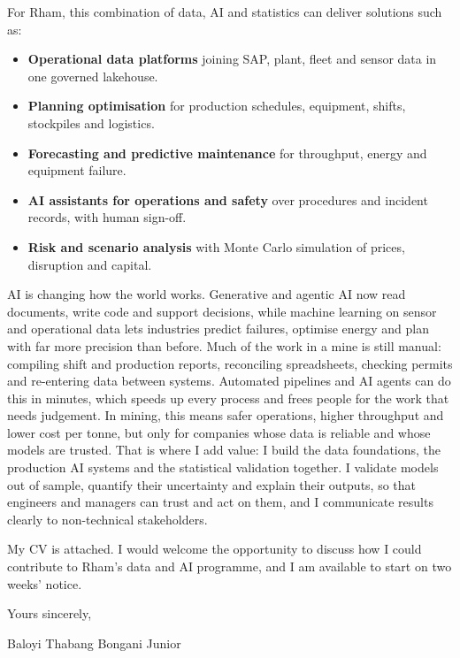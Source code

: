\documentclass[a4paper,11pt]{article}
\begin{document}
For Rham, this combination of data, AI and statistics can deliver solutions such as:
\begin{itemize}[leftmargin=0.2in,itemsep=1pt,topsep=0pt]
    \item \textbf{Operational data platforms} joining SAP, plant, fleet and sensor data in one governed lakehouse.
    \item \textbf{Planning optimisation} for production schedules, equipment, shifts, stockpiles and logistics.
    \item \textbf{Forecasting and predictive maintenance} for throughput, energy and equipment failure.
    \item \textbf{AI assistants for operations and safety} over procedures and incident records, with human sign-off.
    \item \textbf{Risk and scenario analysis} with Monte Carlo simulation of prices, disruption and capital.
\end{itemize}

AI is changing how the world works. Generative and agentic AI now read documents, write code and
support decisions, while machine learning on sensor and operational data lets industries predict
failures, optimise energy and plan with far more precision than before. Much of the work in a mine is
still manual: compiling shift and production reports, reconciling spreadsheets, checking permits and
re-entering data between systems. Automated pipelines and AI agents can do this in minutes, which speeds
up every process and frees people for the work that needs judgement. In mining, this means safer
operations, higher throughput and lower cost per tonne, but only for companies whose data is reliable
and whose models are trusted. That is where I add value: I build the data foundations, the production
AI systems and the statistical validation together. I validate models out of sample, quantify their
uncertainty and explain their outputs, so that engineers and managers can trust and act on them, and
I communicate results clearly to non-technical stakeholders.

My CV is attached. I would welcome the opportunity to discuss how I could contribute to Rham's data and
AI programme, and I am available to start on two weeks' notice.

Yours sincerely,

\vspace{2pt}
Baloyi Thabang Bongani Junior
\end{document}
